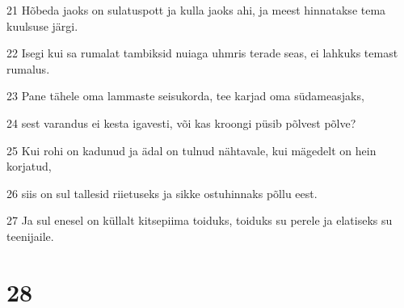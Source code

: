 \par 21 Hõbeda jaoks on sulatuspott ja kulla jaoks ahi, ja meest hinnatakse tema kuulsuse järgi.
\par 22 Isegi kui sa rumalat tambiksid nuiaga uhmris terade seas, ei lahkuks temast rumalus.
\par 23 Pane tähele oma lammaste seisukorda, tee karjad oma südameasjaks,
\par 24 sest varandus ei kesta igavesti, või kas kroongi püsib põlvest põlve?
\par 25 Kui rohi on kadunud ja ädal on tulnud nähtavale, kui mägedelt on hein korjatud,
\par 26 siis on sul tallesid riietuseks ja sikke ostuhinnaks põllu eest.
\par 27 Ja sul enesel on küllalt kitsepiima toiduks, toiduks su perele ja elatiseks su teenijaile.

\chapter{28}

